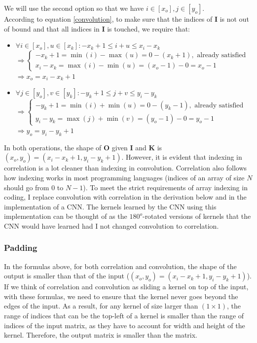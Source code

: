 \documentclass[12pt]{article}
\begin{document}
\begin{itemize}
    We will use the second option so that we have $i \in [x_o], j \in [y_o] $.\\
    According to equation \eqref{convolution}, to make sure that the indices of $\bm{I}$ is not out of bound and that all indices in $\bm{I}$ is touched, we require that:
    \begin{itemize}
        \item $\forall i \in [x_o], u \in [x_k]: -x_k + 1\leq i + u \leq x_i - x_k$\\
        \quad $\Rightarrow
        \begin{cases}
        -x_k + 1 = \min{(i)} - \max{(u)} = 0 - (x_k + 1), \text{ already satisfied}\\
        x_i - x_k = \max{(i)} - \min{(u)} = (x_o - 1) - 0 = x_o - 1
        \end{cases}
        $\\
        \quad $\Rightarrow x_o = x_i - x_k + 1$
        \item $\forall j \in [y_o], v \in [y_k]: -y_k + 1 \leq j + v \leq y_i - y_k$\\
        \quad $\Rightarrow
        \begin{cases}
        -y_k + 1 = \min{(i)} + \min{(u)} = 0 - (y_k - 1), \text{ already satisfied}\\
        y_i - y_k = \max{(j)} + \min{(v)} = (y_o - 1) - 0 = y_o - 1
        \end{cases}
        $\\
        \quad $\Rightarrow y_o = y_i - y_k + 1$
    \end{itemize}
\end{itemize}

In both operations, the shape of $\bm{O}$ given $\bm{I}$ and $\bm{K}$ is $(x_o, y_o) = (x_i - x_k + 1, y_i - y_k + 1)$. However, it is evident that indexing in correlation is a lot cleaner than indexing in convolution. Correlation also follows how indexing works in most programming languages (indices of an array of size $N$ should go from $0$ to $N - 1$). To meet the strict requirements of array indexing in coding, I replace convolution with correlation in the derivation below and in the implementation of a CNN. The kernels learned by the CNN using this implementation can be thought of as the $180^o$-rotated versions of kernels that the CNN would have learned had I not changed convolution to correlation.

\subsubsection{Padding}
In the formulas above, for both correlation and convolution, the shape of the output is smaller than that of the input ($(x_o, y_o) = (x_i - x_k + 1, y_i - y_k + 1)$). If we think of correlation and convolution as sliding a kernel on top of the input, with these formulas, we need to ensure that the kernel never goes beyond the edges of the input. As a result, for any kernel of size larger than $(1 \times 1)$, the range of indices that can be the top-left of a kernel is smaller than the range of indices of the input matrix, as they have to account for width and height of the kernel. Therefore, the output matrix is smaller than the matrix.
\end{document}
